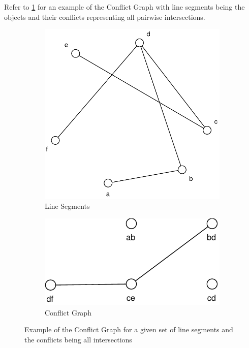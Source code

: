 Refer to \cref{fig:example_conflict_graph} for an example of the
Conflict Graph with line segments being the objects and their
conflicts representing all pairwise intersections.

\begin{figure}[ht]
  \centering
  \begin{subfigure}[b]{0.4\textwidth}
          \centering
          \includegraphics[width=\textwidth]{img/example_conflict_graph_segments.pdf}
          \caption{Line Segments}
  \end{subfigure}
  \hspace{2em}
  \VRule
  \hspace{2em}
  \begin{subfigure}[b]{0.4\textwidth}
          \centering
          \includegraphics[width=\textwidth]{img/example_conflict_graph.pdf}
          \caption{Conflict Graph}
  \end{subfigure}  
  \caption{\label{fig:example_conflict_graph}Example of the Conflict %
    Graph for a given set of line segments %
    and the conflicts being all intersections}
\end{figure}

